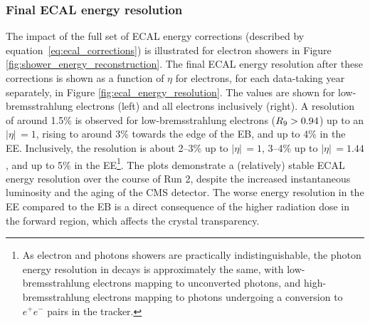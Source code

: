 \subsubsection{Final ECAL energy resolution}
The impact of the full set of ECAL energy corrections (described by equation~\ref{eq:ecal_corrections}) is illustrated for electron showers in Figure \ref{fig:shower_energy_reconstruction}. The final ECAL energy resolution after these corrections is shown as a function of $\eta$ for \Zee electrons, for each data-taking year separately, in Figure \ref{fig:ecal_energy_resolution}. The values are shown for low-bremsstrahlung electrons (left) and all electrons inclusively (right). A resolution of around 1.5\% is observed for low-bremsstrahlung electrons ($R_9>0.94$) up to an $|\eta|\,=1$, rising to around 3\% towards the edge of the EB, and up to 4\% in the EE. Inclusively, the resolution is about 2--3\% up to $|\eta|\,=1$, 3--4\% up to $|\eta|\,=1.44$, and up to 5\% in the EE\footnote{As electron and photons showers are practically indistinguishable, the photon energy resolution in \Hgg decays is approximately the same, with low-bremsstrahlung electrons mapping to unconverted photons, and high-bremsstrahlung electrons mapping to photons undergoing a conversion to $e^+e^-$ pairs in the tracker.}. The plots demonstrate a (relatively) stable ECAL energy resolution over the course of Run 2, despite the increased instantaneous luminosity and the aging of the CMS detector. The worse energy resolution in the EE compared to the EB is a direct consequence of the higher radiation dose in the forward region, which affects the crystal transparency.


